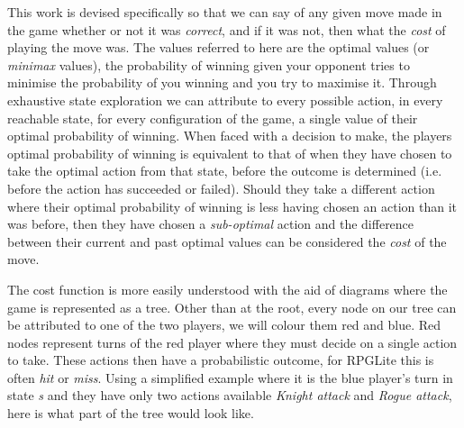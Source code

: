 \documentclass{tufte-handout}
\begin{document}
This work is devised specifically so that we can say of any given move made in the game whether or not it was \textit{correct}, and if it was not, then what the \textit{cost} of playing the move was. The values referred to here are the optimal values (or \textit{minimax} values), the probability of winning given your opponent tries to minimise the probability of you winning and you try to maximise it. Through exhaustive state exploration we can attribute to every possible action, in every reachable state, for every configuration of the game, a single value of their optimal probability of winning. When faced with a decision to make, the players optimal probability of winning is equivalent to that of when they have chosen to take the optimal action from that state, before the outcome is determined (i.e. before the action has succeeded or failed). Should they take a different action where their optimal probability of winning is less having chosen an action than it was before, then they have chosen a \textit{sub-optimal} action and the difference between their current and past optimal values can be considered the \textit{cost} of the move. 

The cost function is more easily understood with the aid of diagrams where the game is represented as a tree. Other than at the root, every node on our tree can be attributed to one of the two players, we will colour them red and blue. Red nodes represent turns of the red player where they must decide on a single action to take. These actions then have a probabilistic outcome, for RPGLite this is often \textit{hit} or \textit{miss}. Using a simplified example where it is the blue player's turn in state \emph{s} and they have only two actions available \emph{Knight attack} and \emph{Rogue attack}, here is what part of the tree would look like.
\end{document}
